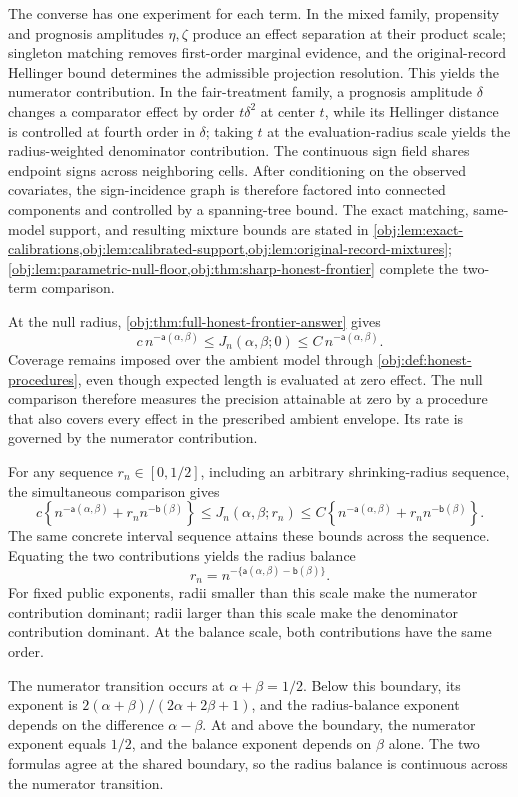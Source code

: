 \documentclass[11pt]{article}
\begin{document}
The converse has one experiment for each term. In the mixed family, propensity
and prognosis amplitudes \(\eta,\zeta\) produce an effect separation at their
product scale; singleton matching removes first-order marginal evidence, and
the original-record Hellinger bound determines the admissible projection
resolution. This yields the numerator contribution. In the fair-treatment
family, a prognosis amplitude \(\delta\) changes a comparator effect by order
\(t\delta^2\) at center \(t\), while its Hellinger distance is controlled at
fourth order in \(\delta\); taking \(t\) at the evaluation-radius scale yields
the radius-weighted denominator contribution. The continuous sign field shares
endpoint signs across neighboring cells. After conditioning on the observed
covariates, the sign-incidence graph is therefore factored into connected
components and controlled by a spanning-tree bound. The exact matching,
same-model support, and resulting mixture bounds are stated in
\cref{obj:lem:exact-calibrations,obj:lem:calibrated-support,obj:lem:original-record-mixtures};
\cref{obj:lem:parametric-null-floor,obj:thm:sharp-honest-frontier} complete the
two-term comparison.

At the null radius, \cref{obj:thm:full-honest-frontier-answer} gives
\[
c\,n^{-\mathsf a(\alpha,\beta)}
\le J_n(\alpha,\beta;0)
\le C\,n^{-\mathsf a(\alpha,\beta)}.
\]
Coverage remains imposed over the ambient model through \cref{obj:def:honest-procedures}, even though expected length is evaluated at zero effect. The null comparison therefore measures the precision attainable at zero by a procedure that also covers every effect in the prescribed ambient envelope. Its rate is governed by the numerator contribution.

For any sequence \(r_n\in[0,1/2]\), including an arbitrary shrinking-radius sequence, the simultaneous comparison gives
\[
c\left\{
n^{-\mathsf a(\alpha,\beta)}
+r_n n^{-\mathsf b(\beta)}
\right\}
\le J_n(\alpha,\beta;r_n)
\le
C\left\{
n^{-\mathsf a(\alpha,\beta)}
+r_n n^{-\mathsf b(\beta)}
\right\}.
\]
The same concrete interval sequence attains these bounds across the sequence. Equating the two contributions yields the radius balance
\[
r_n=n^{-\{\mathsf a(\alpha,\beta)-\mathsf b(\beta)\}}.
\]
For fixed public exponents, radii smaller than this scale make the numerator contribution dominant; radii larger than this scale make the denominator contribution dominant. At the balance scale, both contributions have the same order.

The numerator transition occurs at \(\alpha+\beta=1/2\). Below this boundary, its exponent is \(2(\alpha+\beta)/(2\alpha+2\beta+1)\), and the radius-balance exponent depends on the difference \(\alpha-\beta\). At and above the boundary, the numerator exponent equals \(1/2\), and the balance exponent depends on \(\beta\) alone. The two formulas agree at the shared boundary, so the radius balance is continuous across the numerator transition.
\end{document}
